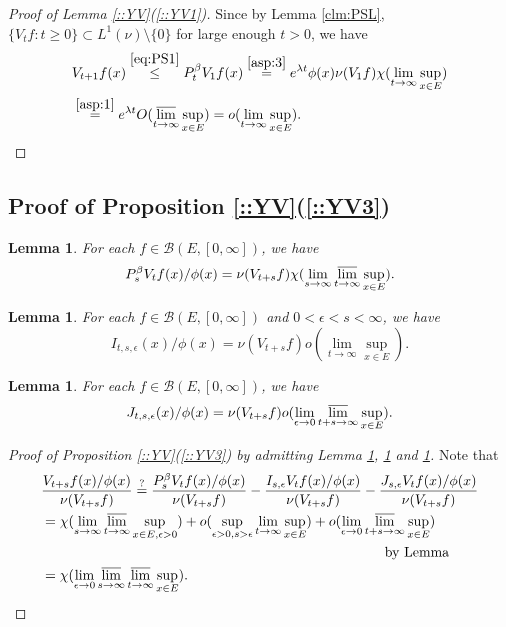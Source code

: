 \documentclass[12pt,a4paper]{amsart}
\numberwithin{equation}{section}
\theoremstyle{plain}
\newtheorem{lem}[thm]{Lemma}
\theoremstyle{definition}
\theoremstyle{remark}
\begin{document}
\begin{proof}[Proof of Lemma \ref{::YV}(\ref{::YV1})]
    Since by Lemma \ref{clm:PSL}, $\{V_tf:t\geq 0\}\subset L^1(\nu)\setminus \{0\}$ for large enough $t>0$, we have 
    \begin{align} 
      & V_{t+1}f (x)
        \overset{\eqref{eq:PS1}}{\leq} P_t^\beta V_1 f(x) 
        \overset{\ref{asp:3}}{=} e^{\lambda t}\phi(x) \nu( V_1 f) \chi(\lim_{t\to \infty} \sup_{x\in E}) 
      \\& \overset{\ref{asp:1}}{=}e^{\lambda t} O(\varlimsup_{t\to \infty}\sup_{x\in E})
      = o(\lim_{t\to \infty}\sup_{x\in E}).
      \qedhere
    \end{align}
  \end{proof}


 \subsection{Proof of Proposition \ref{::YV}(\ref{::YV3})} 
 
\begin{lem} \label{::YV3P} For each $f\in \mathcal B(E,[0,\infty])$, we have
\[
  P_s^\beta V_tf (x)/ \phi(x) = \nu(V_{t+s}f) \chi(\lim_{s\to \infty} \varlimsup_{t\to \infty} \sup_{x\in E}).
\]
\end{lem}
 
\begin{lem} \label{::YV3I} For each $f \in \mathcal B(E,[0,\infty])$ and $0 < \epsilon < s< \infty$, we have
  \[
     I_{t,s,\epsilon}(x)/\phi(x) 
     = \nu(V_{t+s}f) o(\lim_{t\to \infty}\sup_{x\in E}).
   \]
\end{lem}
   
\begin{lem} \label{::YV3J} For each $f\in \mathcal B(E,[0,\infty])$, we have
\[
  J_{t,s,\epsilon}(x)/\phi(x) 
  = \nu(V_{t+s}f) o(\lim_{\epsilon \to 0} \varlimsup_{t+s\to \infty} \sup_{x\in E}).
\] 
\end{lem}

 \begin{proof}[Proof of Proposition \ref{::YV}(\ref{::YV3}) by admitting Lemma \ref{::YV3P}, \ref{::YV3I} and \ref{::YV3J}]
   Note that
   \begin{align}
     & \frac{V_{t+s}f(x)/\phi(x)}{\nu(V_{t+s}f)}
       \overset{?} =  \frac{P_s^\beta V_t f(x)/\phi(x)}{\nu(V_{t+s}f)} - \frac{I_{s,\epsilon} V_t f(x)/\phi(x)}{\nu(V_{t+s}f)} - \frac{J_{s,\epsilon} V_t f(x)/\phi(x)}{\nu(V_{t+s}f)}
     \\& \begin{multlined} = \chi(\lim_{s\to \infty} \varlimsup_{t\to \infty} \sup_{x\in E, \epsilon >0})
     + o(\sup_{\epsilon > 0, s> \epsilon}\lim_{t\to \infty}\sup_{x\in E})
     + o(\lim_{\epsilon \to 0} \varlimsup_{t+s\to \infty} \sup_{x\in E}) \\
     \text{by Lemma}
     \end{multlined}
     \\ & = \chi(\lim_{\epsilon \to 0} \varlimsup_{s\to \infty} \varlimsup_{t\to \infty} \sup_{x\in E}).
   \end{align}
   
 \end{proof}
\end{document}

